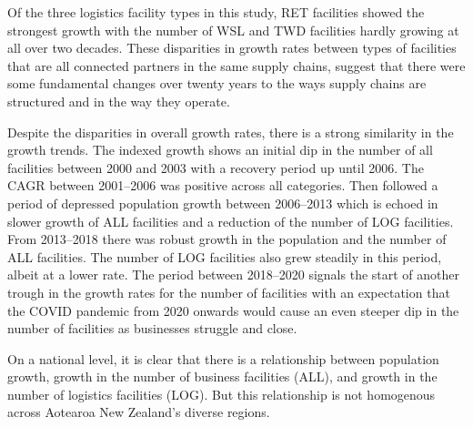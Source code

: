\documentclass[3p, a4paper, authoryear, 11pt, fleqn, review]{elsarticle}
\begin{document}
Of the three logistics facility types in this study, RET facilities showed the strongest growth with the number of WSL and TWD facilities hardly growing at all over two decades. These disparities in growth rates between types of facilities that are all connected partners in the same supply chains, suggest that there were some fundamental changes over twenty years to the ways supply chains are structured and in the way they operate. 

Despite the disparities in overall growth rates, there is a strong similarity in the growth trends. The indexed growth shows an initial dip in the number of all facilities between 2000 and 2003 with a recovery period up until 2006. The \ac{CAGR} between 2001--2006 was positive across all categories. Then followed a period of depressed population growth between 2006--2013 which is echoed in slower growth of ALL facilities and a reduction of the number of LOG facilities. From 2013--2018 there was robust growth in the population and the number of ALL facilities. The number of LOG facilities also grew steadily in this period, albeit at a lower rate. The period between 2018--2020 signals the start of another trough in the growth rates for the number of facilities with an expectation that the COVID pandemic from 2020 onwards would cause an even steeper dip in the number of facilities as businesses struggle and close. 

On a national level, it is clear that there is a relationship between population growth, growth in the number of business facilities (ALL), and growth in the number of logistics facilities (LOG). But this relationship is not homogenous across Aotearoa New Zealand's diverse regions.  
\end{document}
